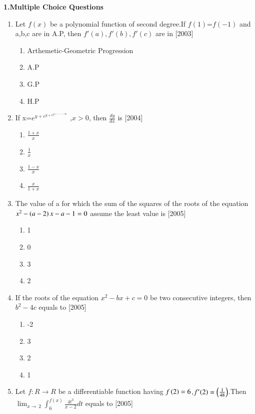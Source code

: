 \documentclass[journal,12pt,twocolumn]{IEEEtran}
\theoremstyle{remark}
\begin{document}
\maketitle \textbf{1.Multiple Choice Questions}
\begin{enumerate}
    \item Let $f(x)$ be a polynomial function of second degree.If $f(1)$=$f(-1)$ and a,b,c are in A.P, then $f'(a),f'(b),f'(c)$ are in
    \hfill[2003]\break
    \begin{enumerate}
    \item Arthemetic-Geometric Progression
    \item A.P
    \item G.P
    \item H.P\\
    
    \end{enumerate}
    \item If x=$e^{y+e^{y+e^{y+---\infty}}}$ ,$x>0$, then $\frac{dy}{dx}$ is
    \hfill[2004]\break
    \begin{multicols}{4}
    \begin{enumerate}
    \item $\frac{1+x}{x}$
    \item $\frac{1}{x}$
    \item $\frac{1-x}{x}$
    \item $\frac{x}{1+x}$
\end{enumerate}
\end{multicols}
\item The value of a for which the sum of the squares of the roots of the equation $x^2-\left(a-2\right)x-a-1=0$ assume the least value is
\hfill[2005]\break
\begin{multicols}{4}
\begin{enumerate}
    \item 1
    \item 0
    \item 3
    \item 2
    \end{enumerate}
    \end{multicols}
    \item If the roots of the equation $x^2-bx+c=0$ be   two  consecutive integers, then $b^2-4c$  equals  to
    \hfill[2005]\break
    \begin{multicols}{4}
    \begin{enumerate}
        \item -2
        \item 3
        \item 2
        \item 1
    \end{enumerate}
    \end{multicols}
    \item Let $f:R\rightarrow R$ be a differentiable function having $f\left(2\right)=6$,$f'(2)=\left(\frac{1}{48}\right)$.Then $\lim_{x\to\ 2} \int_{6}^{f(x)} \frac{4t^3}{x-2} dt$ equals to
    \hfill[2005]\break
    \begin{multicols}{4}
        

\end{multicols}
\end{enumerate}
\end{document}
